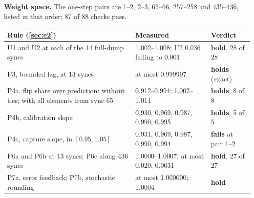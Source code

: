 \documentclass[11pt]{article}
\begin{document}
\textbf{Weight space.} The one-step pairs are 1--2, 2--3, 65--66, 257--258 and 435--436, listed in that order; 87 of 88 checks pass.
\begin{center}\small
\begin{tabularx}{\linewidth}{@{}L l l@{}}
\toprule
Rule (\cref{sec:e2}) & Measured & Verdict\\
\midrule
U1 and U2 at each of the 14 full-dump syncs & 1.002--1.008; U2 0.036 falling to 0.001 & \textbf{hold}, 28 of 28\\
P3, bounded lag, at 13 syncs & at most 0.999997 & \textbf{holds} (exact)\\
P4a, flip share over prediction: without ties; with all elements from sync 65 & 0.912--0.994; 1.002--1.011 & \textbf{holds}, 8 of 8\\
P4b, calibration slope & 0.930, 0.969, 0.987, 0.990, 0.995 & \textbf{holds}, 5 of 5\\
P4c, capture slope, in $[0.95,1.05]$ & 0.931, 0.969, 0.987, 0.990, 0.994 & \textbf{fails} at pair 1--2\\
P6a and P6b at 13 syncs; P6c along 436 syncs & 1.0000--1.0007; at most 0.020; 0.0031 & \textbf{hold}, 27 of 27\\
P7a, error feedback; P7b, stochastic rounding & at most 1.000000; 1.0004 & \textbf{hold}\\
\bottomrule
\end{tabularx}
\end{center}
\end{document}

